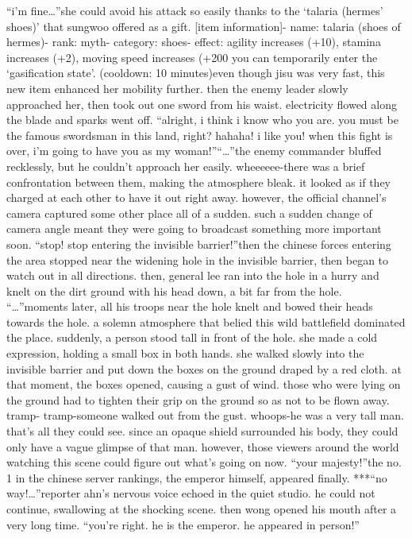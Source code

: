 “i’m fine…”she could avoid his attack so easily thanks to the ‘talaria (hermes’ shoes)’ that sungwoo offered as a gift.
[item information]- name: talaria (shoes of hermes)- rank: myth- category: shoes- effect: agility increases (+10), stamina increases (+2), moving speed increases (+200%
 you can temporarily enter the ‘gasification state’.
 (cooldown: 10 minutes)even though jisu was very fast, this new item enhanced her mobility further.
then the enemy leader slowly approached her, then took out one sword from his waist.
electricity flowed along the blade and sparks went off.
“alright, i think i know who you are.
 you must be the famous swordsman in this land, right? hahaha! i like you! when this fight is over, i’m going to have you as my woman!”“…”the enemy commander bluffed recklessly, but he couldn’t approach her easily.
wheeeeee-there was a brief confrontation between them, making the atmosphere bleak.
it looked as if they charged at each other to have it out right away.
however, the official channel’s camera captured some other place all of a sudden.
such a sudden change of camera angle meant they were going to broadcast something more important soon.
“stop! stop entering the invisible barrier!”then the chinese forces entering the area stopped near the widening hole in the invisible barrier, then began to watch out in all directions.
then, general lee ran into the hole in a hurry and knelt on the dirt ground with his head down, a bit far from the hole.
“…”moments later, all his troops near the hole knelt and bowed their heads towards the hole.
a solemn atmosphere that belied this wild battlefield dominated the place.
suddenly, a person stood tall in front of the hole.
 she made a cold expression, holding a small box in both hands.
she walked slowly into the invisible barrier and put down the boxes on the ground draped by a red cloth.
at that moment, the boxes opened, causing a gust of wind.
 those who were lying on the ground had to tighten their grip on the ground so as not to be flown away.
tramp- tramp-someone walked out from the gust.
whoops-he was a very tall man.
 that’s all they could see.
since an opaque shield surrounded his body, they could only have a vague glimpse of that man.
however, those viewers around the world watching this scene could figure out what’s going on now.
“your majesty!”the no.
 1 in the chinese server rankings, the emperor himself, appeared finally.
***“no way!…”reporter ahn’s nervous voice echoed in the quiet studio.
 he could not continue, swallowing at the shocking scene.
then wong opened his mouth after a very long time.
“you’re right.
 he is the emperor.
 he appeared in person!”

